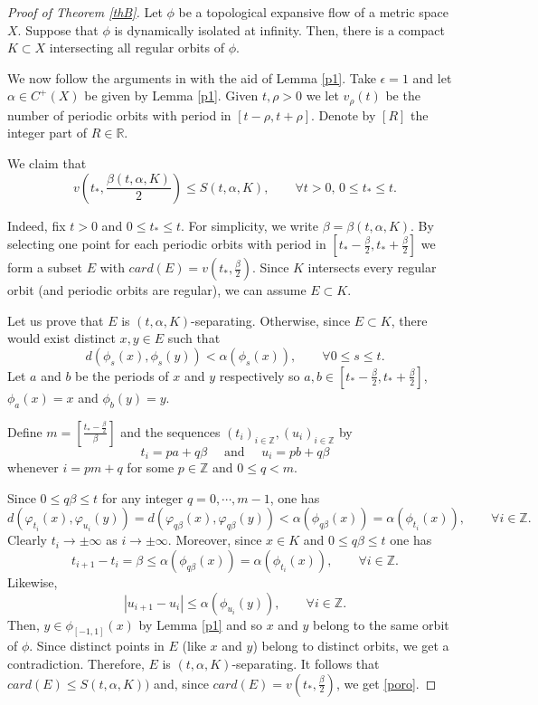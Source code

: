 \documentclass[11pt,letterpaper]{amsart}
\begin{document}
\begin{proof}[Proof of Theorem \ref{thB}]
Let $\phi$ be a topological expansive flow of a metric space $X$.
Suppose that $\phi$ is dynamically isolated at infinity.
Then, there is a compact $K\subset X$ intersecting all regular orbits of $\phi$.

We now follow the arguments in \cite{bw} with the aid of Lemma \ref{p1}.
Take $\epsilon=1$ and let $\alpha\in C^+(X)$ be given by Lemma \ref{p1}.
Given $t,\rho>0$ we let $v_\rho(t)$ be the number of periodic orbits with period in $[t-\rho,t+\rho]$.
Denote by $[R]$ the integer part of $R\in \mathbb{R}$.

We claim that
\begin{equation}
\label{poro}
v(t_*, {\frac{\beta(t,\alpha,K)}2})\leq S(t,\alpha,K),\quad\quad\forall t>0,\, 0\leq t_*\leq t.
\end{equation}

Indeed, fix $t>0$ and $0\leq t_*\leq t$. For simplicity, we write $\beta=\beta(t,\alpha,K)$.
By selecting one point for each periodic orbits with period in $[t_*-\frac{\beta}2,t_*+\frac{\beta}2]$ we form a subset $E$ with $card(E)=v(t_*,{\frac{\beta}2})$. Since $K$ intersects every regular orbit (and periodic orbits are regular), we can assume $E\subset K$.

Let us prove that $E$ is $(t,\alpha,K)$-separating.
Otherwise, since $E\subset K$, there would exist distinct $x,y\in E$ such that
$$
d(\phi_s(x),\phi_s(y))<\alpha(\phi_s(x)),\quad\quad\forall 0\leq s\leq t.
$$
Let $a$ and $b$ be the periods of $x$ and $y$ respectively so
$a,b\in [t_*-\frac{\beta}2,t_*+\frac{\beta}2]$, $\phi_a(x)=x$ and $\phi_b(y)=y$.

Define $m=[\frac{t_*-\frac{\beta}2}\beta]$ and the sequences
$(t_i)_{i\in\mathbb{Z}},(u_i)_{i\in\mathbb{Z}}$ by
$$
t_i=pa+q\beta\quad\mbox{ and }\quad u_i=pb+q\beta
$$
whenever $i=pm+q$ for some $p\in \mathbb{Z}$ and $0\leq q<m$.

Since $0\leq q\beta\leq t$ for any integer $q=0,\cdots, m-1$,
one has
$$
d(\varphi_{t_i}(x),\varphi_{u_i}(y))=d(\varphi_{q\beta}(x),\varphi_{q\beta}(y))<\alpha(\phi_{q\beta}(x))=\alpha(\phi_{t_i}(x)),\quad\quad\forall i\in\mathbb{Z}.
$$
Clearly $t_i\to\pm\infty$ as $i\to\pm\infty$.
Moreover, since $x\in K$ and $0\leq q\beta\leq t$ one has
$$
t_{i+1}-t_i=\beta\leq\alpha(\phi_{q\beta}(x))=\alpha(\phi_{t_i}(x)),\quad\quad\forall i\in\mathbb{Z}.
$$
Likewise,
$$
|u_{i+1}-u_i|\leq\alpha(\phi_{u_i}(y)), \quad\quad\forall i\in\mathbb{Z}.
$$
Then, $y\in \phi_{[-1,1]}(x)$ by Lemma \ref{p1} and so $x$ and $y$ belong to the same orbit of $\phi$.
Since distinct points in $E$ (like $x$ and $y$) belong to distinct orbits,
we get a contradiction.
Therefore, $E$ is $(t,\alpha,K)$-separating.
It follows that
$card(E)\leq S(t,\alpha,K))$ and, since $card(E)=v(t_*, {\frac{\beta}2})$,
we get \eqref{poro}.


\end{proof}
\end{document}
